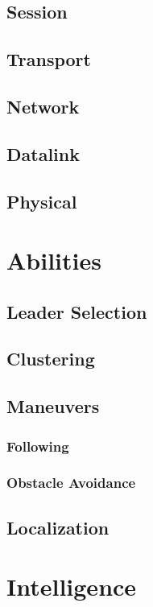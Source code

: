 \documentclass[a4paper,10pt]{article}
\theoremstyle{theorem}
\begin{document}
\subsection{Session}
\subsection{Transport}
\subsection{Network}
\subsection{Datalink}
\subsection{Physical}

\section{Abilities}
\subsection{Leader Selection}
\subsection{Clustering}
\subsection{Maneuvers}
\subsubsection{Following}
\subsubsection{Obstacle Avoidance}
\subsection{Localization}

\section{Intelligence}
\subsection{}





\end{document}
